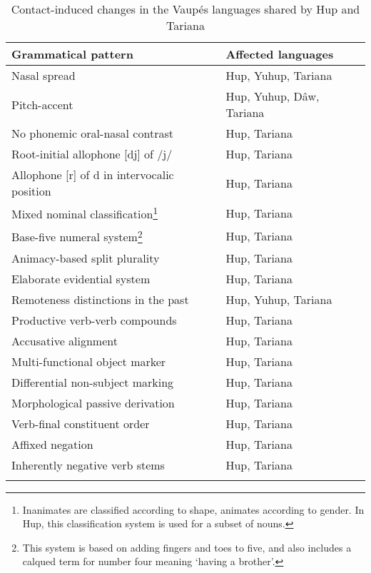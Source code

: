 \documentclass[output=paper]{langscibook}
\begin{document}
\begin{table}
\caption{Contact-induced changes in the Vaupés languages shared by Hup and Tariana}  
\label{tab-vaupes}
 \begin{tabular}{p{6.7cm} p{4.3cm}} 
  \lsptoprule
  Grammatical pattern & Affected languages \\ 
  \midrule
Nasal spread & Hup, Yuhup, Tariana \\
Pitch-accent & Hup, Yuhup, Dâw, Tariana \\
No phonemic oral-nasal contrast & Hup, Tariana \\
Root-initial allophone [dj] of /j/ & Hup, Tariana \\
Allophone [r] of d in intervocalic position & Hup, Tariana \\
Mixed nominal classification\footnote{Inanimates are classified according to shape, animates according to gender. In Hup, this classification system is used for a subset of nouns.} & Hup, Tariana \\
Base-five numeral system\footnote{This system is based on adding fingers and toes to five, and also includes a calqued term for number four meaning `having a brother'.} & Hup, Tariana \\
Animacy-based split plurality & Hup, Tariana \\
Elaborate evidential system & Hup, Tariana \\
Remoteness distinctions in the past & Hup, Yuhup, Tariana \\
Productive verb-verb compounds & Hup, Tariana \\
Accusative alignment & Hup, Tariana \\
Multi-functional object marker & Hup, Tariana \\
Differential non-subject marking & Hup, Tariana \\
Morphological passive derivation & Hup, Tariana \\
Verb-final constituent order & Hup, Tariana \\
Affixed negation & Hup, Tariana \\
Inherently negative verb stems & Hup, Tariana \\
\lspbottomrule
 \end{tabular}
\end{table}
\end{document}
